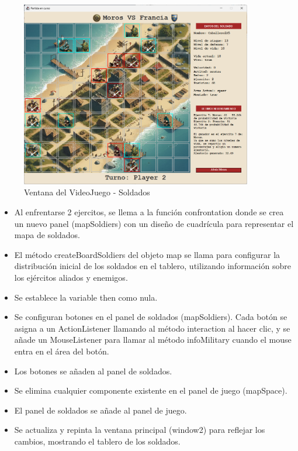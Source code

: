 \documentclass{article}
\begin{document}
\newpage
    \begin{figure}[H]
        \centering
		\includegraphics[width=0.9\textwidth,keepaspectratio]{img/Menu_Tablero_Soldados.png}
        \caption{Ventana del VideoJuego - Soldados}
    \end{figure}

    \begin{itemize}	
		\item Al enfrentarse 2 ejercitos, se llema a la función confrontation donde se crea un nuevo panel (mapSoldiers) con un diseño de cuadrícula para representar el mapa de soldados.
            \item El método createBoardSoldiers del objeto map se llama para configurar la distribución inicial de los soldados en el tablero, utilizando información sobre los ejércitos aliados y enemigos.
            \item Se establece la variable then como nula.
            \item Se configuran botones en el panel de soldados (mapSoldiers). Cada botón se asigna a un ActionListener llamando al método interaction al hacer clic, y se añade un MouseListener para llamar al método infoMilitary cuando el mouse entra en el área del botón.
            \item Los botones se añaden al panel de soldados.
            \item Se elimina cualquier componente existente en el panel de juego (mapSpace).
            \item El panel de soldados se añade al panel de juego.
            \item Se actualiza y repinta la ventana principal (window2) para reflejar los cambios, mostrando el tablero de los soldados.
	\end{itemize}
\end{document}
